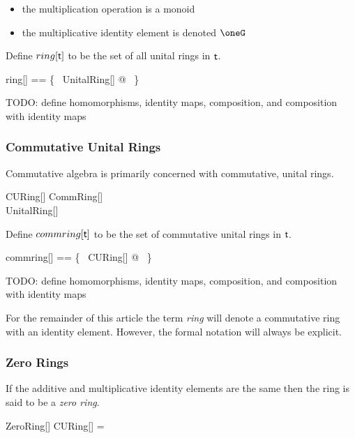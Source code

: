 \documentclass{amsart}
\begin{document}
\begin{itemize}
	\item the multiplication operation is a monoid
	\item the multiplicative identity element is denoted $\oneG$
\end{itemize}

Define $ring[\mathsf{t}]$ to be the set of all unital rings in $\mathsf{t}$.

\begin{zed}
	ring[\genT] == \{~ UnitalRing[\genT] @ \strucA ~\}
\end{zed}

TODO: define homomorphisms, identity maps, composition, and composition with identity maps

\subsubsection{Commutative Unital Rings}

Commutative algebra is primarily concerned with commutative, unital rings.

\begin{schema}{CURing}[\genT]
	CommRing[\genT] \\
	UnitalRing[\genT]
\end{schema}

Define $commring[\mathsf{t}]$ to be the set of commutative unital rings in $\mathsf{t}$.

\begin{zed}
	commring[\genT] == \{~ CURing[\genT] @ \strucA ~\}
\end{zed}

TODO: define homomorphisms, identity maps, composition, and composition with identity maps

For the remainder of this article the term \textit{ring} will denote a commutative ring with an identity element.
However, the formal notation will always be explicit.

\subsubsection{Zero Rings}

If the additive and multiplicative identity elements are the same then the ring is said to be a \textit{zero ring}.

\begin{schema}{ZeroRing}[\genT]
	CURing[\genT]
\where
	\oneG = \zeroG
\end{schema}
\end{document}
